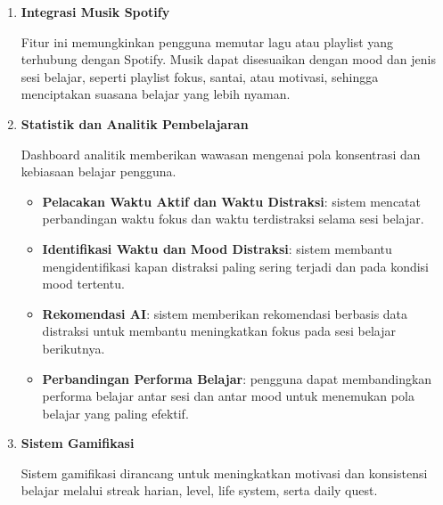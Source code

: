 \documentclass[11pt]{article}
\begin{document}
\begin{enumerate}
\begin{itemize}
\item \textbf{Integrasi Jadwal Kuliah (Opsional)}: pengguna dapat memasukkan jadwal kuliah agar sistem dapat menghindari konflik dan mengisi slot kosong secara cerdas.

\item \textbf{Pengingat dan Notifikasi}: sistem mengingatkan pengguna mengenai jadwal belajar yang akan datang untuk membantu menjaga konsistensi belajar.

\end{itemize}

\item \textbf{Integrasi Musik Spotify}

Fitur ini memungkinkan pengguna memutar lagu atau playlist yang terhubung dengan Spotify. Musik dapat disesuaikan dengan mood dan jenis sesi belajar, seperti playlist fokus, santai, atau motivasi, sehingga menciptakan suasana belajar yang lebih nyaman.

\item \textbf{Statistik dan Analitik Pembelajaran}

Dashboard analitik memberikan wawasan mengenai pola konsentrasi dan kebiasaan belajar pengguna.

\begin{itemize}
\item \textbf{Pelacakan Waktu Aktif dan Waktu Distraksi}: sistem mencatat perbandingan waktu fokus dan waktu terdistraksi selama sesi belajar.

\item \textbf{Identifikasi Waktu dan Mood Distraksi}: sistem membantu mengidentifikasi kapan distraksi paling sering terjadi dan pada kondisi mood tertentu.

\item \textbf{Rekomendasi AI}: sistem memberikan rekomendasi berbasis data distraksi untuk membantu meningkatkan fokus pada sesi belajar berikutnya.

\item \textbf{Perbandingan Performa Belajar}: pengguna dapat membandingkan performa belajar antar sesi dan antar mood untuk menemukan pola belajar yang paling efektif.

\end{itemize}

\item \textbf{Sistem Gamifikasi}

Sistem gamifikasi dirancang untuk meningkatkan motivasi dan konsistensi belajar melalui streak harian, level, life system, serta daily quest.


\end{enumerate}
\end{document}

